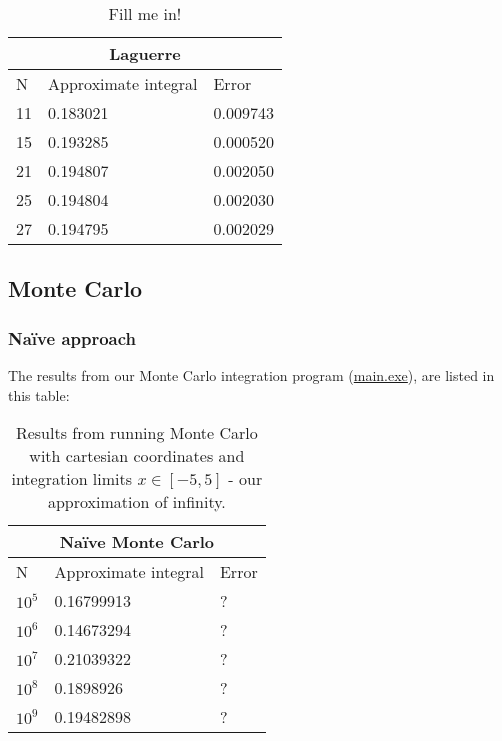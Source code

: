\documentclass[../main.tex]{subfiles}
\begin{document}
\begin{table}[h!]
\begin{center}
\begin{tabular}{ |p{1cm}|p{4cm}|p{3cm}|}
 \hline
 \multicolumn{3}{|c|}{Laguerre} \\
 \hline
       N   & Approximate integral & Error\\
 \hline
 11 &  0.183021 &  0.009743\\
 15 &  0.193285 &  0.000520\\
 21 &  0.194807 &  0.002050\\
 25 &  0.194804 &  0.002030\\
 27 &  0.194795 &  0.002029\\

 \hline
\end{tabular}
\caption{Fill me in!}
\end{center}
\end{table}

\FloatBarrier

\subsection{Monte Carlo}
\subsubsection{Naïve approach}
The results from our Monte Carlo integration program (\href{https://github.com/kmaasrud/Project-3/blob/master/code/Monte-Carlo/main.exe}{main.exe}), are listed in this table:

\begin{table}[h!]
  \begin{center}
    \begin{tabular}{ |p{1cm}|p{4cm}|p{3cm}|}
     \hline
     \multicolumn{3}{|c|}{Naïve Monte Carlo} \\
     \hline
           N   & Approximate integral & Error\\
     \hline
     $10^5$ &  0.16799913 &  ?\\
     $10^6$ &  0.14673294 &  ?\\
     $10^7$ &  0.21039322 &  ?\\
     $10^8$ &  0.1898926 &  ?\\
     $10^9$ &  0.19482898 &  ?\\
    
     \hline
    \end{tabular}
    \caption{Results from running Monte Carlo with cartesian coordinates and integration limits $x\in[-5,5]$ - our approximation of infinity.}
  \end{center}
\end{table}
\end{document}
